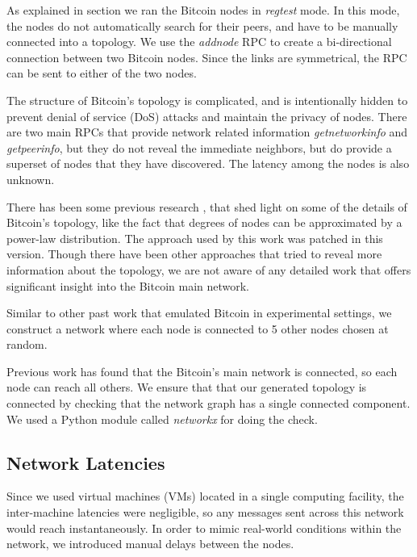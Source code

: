 As explained in section  we ran the Bitcoin nodes in \textit{regtest} mode. In this mode, the nodes do not automatically search for their peers, and have to be manually connected into a topology. We use the \textit{addnode} RPC to create a bi-directional connection between two Bitcoin nodes. Since the links are symmetrical, the RPC can be sent to either of the two nodes. 

The structure of Bitcoin's topology is complicated, and is intentionally hidden to prevent denial of service (DoS) attacks and maintain the privacy of nodes. 
There are two main RPCs that provide network related information \textit{getnetworkinfo} and \textit{getpeerinfo}, but they do not reveal the immediate neighbors, but do provide a superset of nodes that they have discovered. 
The latency among the nodes is also unknown. 

There has been some previous research \cite{eclipseAttack}, \cite{coinscope} that shed light on some of the details of Bitcoin's topology, like the fact that degrees of nodes can be approximated by a power-law distribution. The approach used by this work was patched in this version.  
Though there have been other approaches  that tried to reveal more information about the topology, we are not aware of any detailed work that offers significant insight into the Bitcoin main network.

Similar to other past work \cite{bitcoinNG} that emulated Bitcoin in experimental settings, we construct a network where each node is connected to 5 other nodes chosen at random.

Previous work \cite{btcmap} has found that the Bitcoin's main network is connected, so each node can reach all others. 
We ensure that that our generated topology is connected by checking that the network graph has a single connected component.
We used a Python module called \textit{networkx} for doing the check. 

\subsection{Network Latencies} \label{exp-setup-latencies}

Since we used virtual machines (VMs) located in a single computing facility, the inter-machine latencies were negligible, so any messages sent across this network would reach instantaneously. In order to mimic real-world conditions within the network, we introduced manual delays between the nodes.

